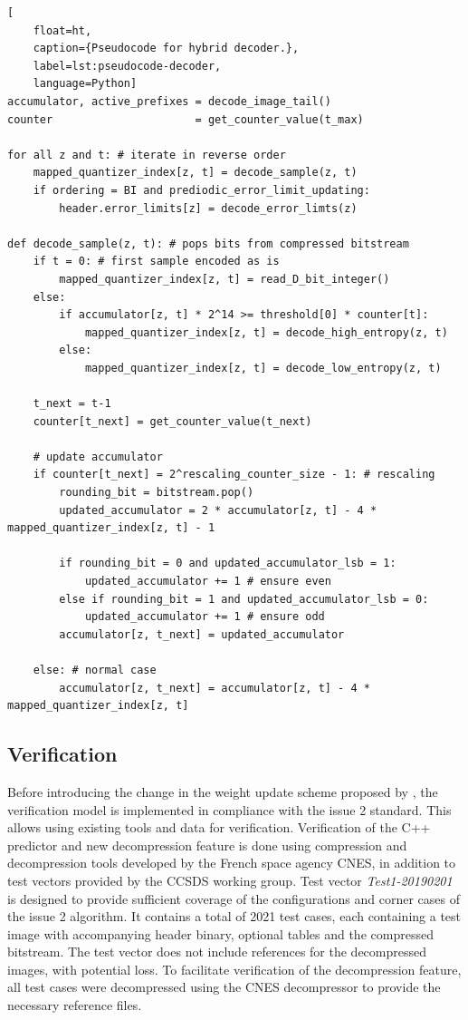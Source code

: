 \begin{lstlisting}[
    float=ht,
    caption={Pseudocode for hybrid decoder.},
    label=lst:pseudocode-decoder,
    language=Python]
accumulator, active_prefixes = decode_image_tail()
counter                      = get_counter_value(t_max)

for all z and t: # iterate in reverse order
    mapped_quantizer_index[z, t] = decode_sample(z, t)
    if ordering = BI and prediodic_error_limit_updating:
        header.error_limits[z] = decode_error_limts(z)

def decode_sample(z, t): # pops bits from compressed bitstream
    if t = 0: # first sample encoded as is
        mapped_quantizer_index[z, t] = read_D_bit_integer()
    else:
        if accumulator[z, t] * 2^14 >= threshold[0] * counter[t]:
            mapped_quantizer_index[z, t] = decode_high_entropy(z, t)
        else:
            mapped_quantizer_index[z, t] = decode_low_entropy(z, t)

    t_next = t-1
    counter[t_next] = get_counter_value(t_next)

    # update accumulator
    if counter[t_next] = 2^rescaling_counter_size - 1: # rescaling
        rounding_bit = bitstream.pop()
        updated_accumulator = 2 * accumulator[z, t] - 4 * mapped_quantizer_index[z, t] - 1

        if rounding_bit = 0 and updated_accumulator_lsb = 1:
            updated_accumulator += 1 # ensure even
        else if rounding_bit = 1 and updated_accumulator_lsb = 0:
            updated_accumulator += 1 # ensure odd
        accumulator[z, t_next] = updated_accumulator

    else: # normal case
        accumulator[z, t_next] = accumulator[z, t] - 4 * mapped_quantizer_index[z, t]
\end{lstlisting}

\subsection{Verification}

Before introducing the change in the weight update scheme proposed by \citeauthor{jiaRemovalFeedbackLoop2025}, the verification model is implemented in compliance with the issue 2 standard. This allows using existing tools and data for verification. Verification of the C++ predictor and new decompression feature is done using compression and decompression tools developed by the French space agency \acrfull{CNES}, in addition to test vectors provided by the \acrshort{CCSDS} working group. Test vector \textit{Test1-20190201} is designed to provide sufficient coverage of the configurations and corner cases of the issue 2 algorithm. It contains a total of 2021 test cases, each containing a test image with accompanying header binary, optional tables and the compressed bitstream. The test vector does not include references for the decompressed images, with potential loss. To facilitate verification of the decompression feature, all test cases were decompressed using the \acrshort{CNES} decompressor to provide the necessary reference files.

